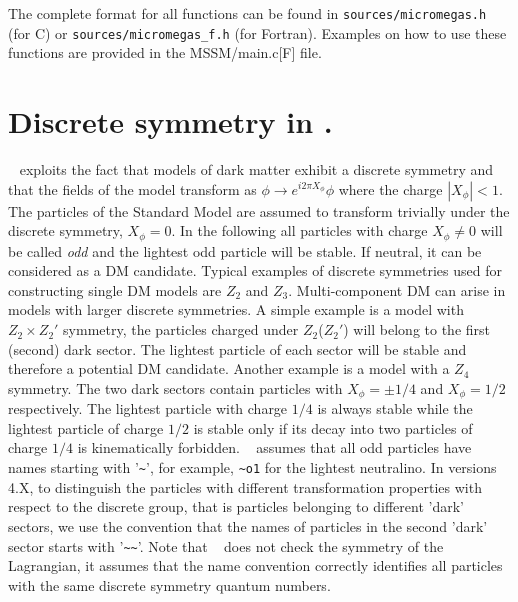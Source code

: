 \documentclass[12pt,a4paper]{article}
\begin{document}
The complete format  for all functions can be found in
\verb|sources/micromegas.h| (for C) or
\verb|sources/micromegas_f.h| (for Fortran). Examples on how to use these functions are provided   
in the MSSM/main.c[F] file. 
 
\section {Discrete symmetry in \micro.}

 \micro~ exploits the fact that models of dark matter exhibit a discrete symmetry
and that the fields  of the model transform as 
$   \phi \to e^{i2\pi X_{\phi}} \phi$
where the charge $|X_{\phi}|<1$. 
The particles of the  Standard Model 
are assumed to transform trivially under the discrete symmetry, $X_\phi=0$. In the following all particles with
 charge $X_\phi\neq 0$  will be called 
 {\it odd} and the  lightest odd particle  will be  stable. If neutral, it can be considered as a DM candidate.
Typical  examples  of discrete symmetries used for constructing single DM models  are $Z_2$ and  $Z_3$. 
Multi-component DM can arise in models with larger discrete symmetries. A simple 
example is a model with  $Z_2\times Z_2'$ symmetry, the particles charged under  $Z_2$($Z_2'$) will belong to the first (second) dark sector. The lightest particle of each sector  will be stable and therefore a potential DM candidate. 
Another example is a model with a $Z_4$  symmetry.  The two dark sectors contain particles with $X_\phi=\pm 1/4$ and $X_\phi=1/2$ respectively. The lightest particle with  charge $1/4$ is always stable while the lightest particle of charge $1/2$ is stable only if its decay into two particles of charge $1/4$ is kinematically forbidden.
 \micro~ assumes that all odd particles have  names
starting with '\verb|~|', for example, \verb|~o1| for the lightest  
neutralino. In versions 4.X, to distinguish the particles with different transformation properties with 
respect to the discrete group, that is particles belonging to different 'dark' sectors,
we use the convention that the names of particles in the second 'dark' sector starts with '\verb|~~|'. 
Note that \micro~ does not check the symmetry of the Lagrangian, it assumes that the name convention 
correctly identifies  all particles with the same discrete symmetry quantum numbers.

  
\end{document}

